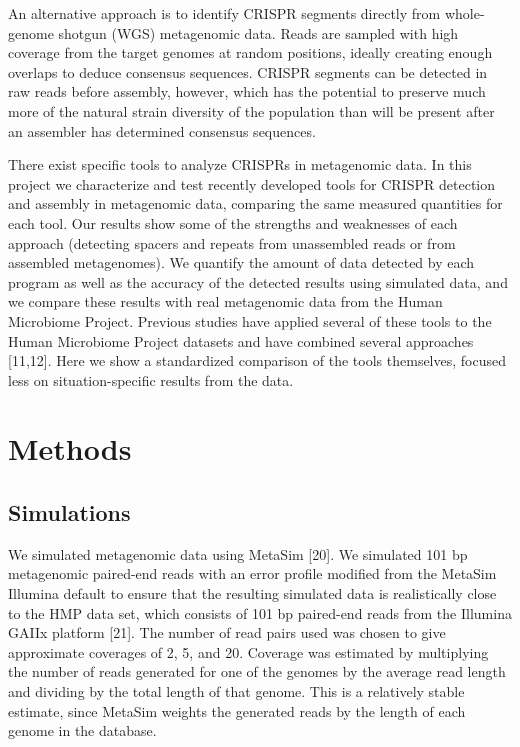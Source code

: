 \documentclass{bmcart}
\begin{document}
An alternative approach is to identify CRISPR segments directly from whole-genome shotgun (WGS) metagenomic data. Reads are sampled with high coverage from the target genomes at random positions, ideally creating enough overlaps to deduce consensus sequences. CRISPR segments can be detected in raw reads before assembly, however, which has the potential to preserve much more of the natural strain diversity of the population than will be present after an assembler has determined consensus sequences. 

There exist specific tools to analyze CRISPRs in metagenomic data. In this project we characterize and test recently developed tools for CRISPR detection and assembly in metagenomic data, comparing the same measured quantities for each tool. Our results show some of the strengths and weaknesses of each approach (detecting spacers and repeats from unassembled reads or from assembled metagenomes). We quantify the amount of data detected by each program as well as the accuracy of the detected results using simulated data, and we compare these results with real metagenomic data from the Human Microbiome Project. Previous studies have applied several of these tools to the Human Microbiome Project datasets and have combined several approaches [11,12]. Here we show a standardized comparison of the tools themselves, focused less on situation-specific results from the data.  

\section*{Methods}
\subsection*{Simulations}
	We simulated metagenomic data using MetaSim [20]. We simulated 101 bp metagenomic paired-end reads with an error profile modified from the MetaSim Illumina default to ensure that the resulting simulated data is realistically close to the HMP data set, which consists of 101 bp paired-end reads from the Illumina GAIIx platform [21]. The number of read pairs used was chosen to give approximate coverages of 2, 5, and 20. Coverage was estimated by multiplying the number of reads generated for one of the genomes by the average read length and dividing by the total length of that genome. This is a relatively stable estimate, since MetaSim weights the generated reads by the length of each genome in the database.
	
\end{document}
